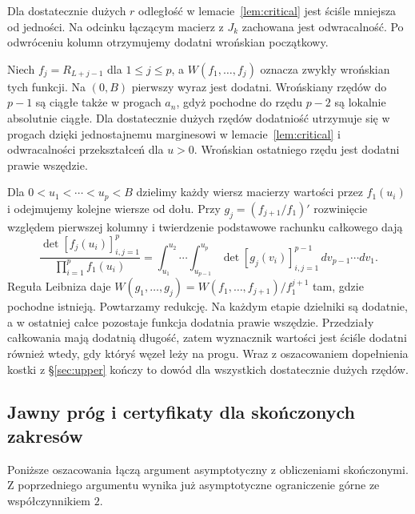 \documentclass[11pt,a4paper,reqno]{amsart}
\numberwithin{equation}{section}
\begin{document}
Dla dostatecznie dużych \(r\) odległość w lemacie~\ref{lem:critical} jest ściśle mniejsza od jedności. Na odcinku łączącym macierz z \(J_k\) zachowana jest odwracalność. Po odwróceniu kolumn otrzymujemy dodatni wrońskian początkowy.

Niech \(f_j=R_{L+j-1}\) dla \(1\le j\le p\), a \(W(f_1,\ldots,f_j)\) oznacza zwykły wrońskian tych funkcji. Na \((0,B)\) pierwszy wyraz jest dodatni. Wrońskiany rzędów do \(p-1\) są ciągłe także w progach \(a_n\), gdyż pochodne do rzędu \(p-2\) są lokalnie absolutnie ciągłe. Dla dostatecznie dużych rzędów dodatniość utrzymuje się w progach dzięki jednostajnemu marginesowi w lemacie~\ref{lem:critical} i odwracalności przekształceń dla \(u>0\). Wrońskian ostatniego rzędu jest dodatni prawie wszędzie.

Dla \(0<u_1<\cdots<u_p<B\) dzielimy każdy wiersz macierzy wartości przez \(f_1(u_i)\) i odejmujemy kolejne wiersze od dołu. Przy \(g_j=(f_{j+1}/f_1)'\) rozwinięcie względem pierwszej kolumny i twierdzenie podstawowe rachunku całkowego dają
\[
\frac{\det[f_j(u_i)]_{i,j=1}^p}{\prod_{i=1}^p f_1(u_i)}
 =\int_{u_1}^{u_2}\!\cdots\!\int_{u_{p-1}}^{u_p}
      \det[g_j(v_i)]_{i,j=1}^{p-1}\,dv_{p-1}\cdots dv_1 .
\]
Reguła Leibniza daje \(W(g_1,\ldots,g_j)=W(f_1,\ldots,f_{j+1})/f_1^{j+1}\) tam, gdzie pochodne istnieją. Powtarzamy redukcję. Na każdym etapie dzielniki są dodatnie, a w ostatniej całce pozostaje funkcja dodatnia prawie wszędzie. Przedziały całkowania mają dodatnią długość, zatem wyznacznik wartości jest ściśle dodatni również wtedy, gdy któryś węzeł leży na progu. Wraz z oszacowaniem dopełnienia kostki z \S\ref{sec:upper} kończy to dowód dla wszystkich dostatecznie dużych rzędów.

\subsection{Jawny próg i certyfikaty dla skończonych zakresów}\label{sec:finite}


Poniższe oszacowania łączą argument asymptotyczny z obliczeniami skończonymi. Z poprzedniego argumentu wynika już asymptotyczne ograniczenie górne ze współczynnikiem \(2\).
\end{document}
